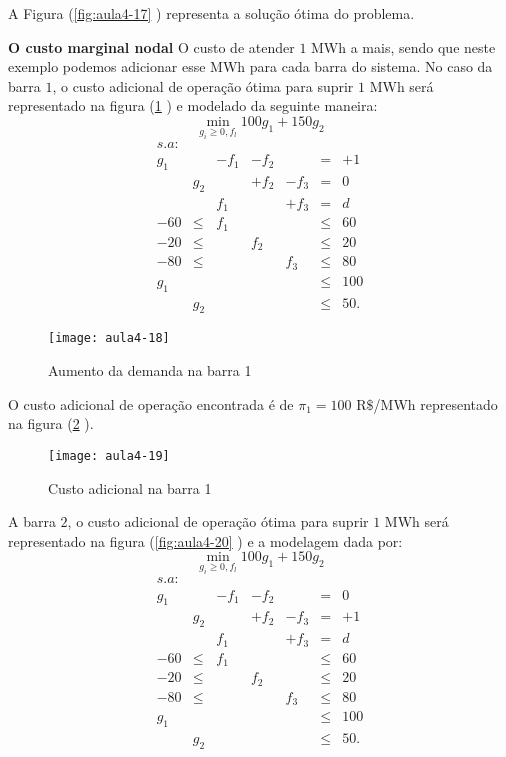 A Figura (\ref{fig:aula4-17} ) representa a solução ótima do problema.

\textbf{O custo marginal nodal}
O custo de atender $1$ MWh a mais, sendo que neste exemplo podemos adicionar esse MWh para cada barra do sistema.
No caso da barra $1$, o custo adicional de operação ótima para suprir $1$ MWh será representado na figura (\ref{fig:aula4-18} ) e  modelado da seguinte maneira:
\[
\min_{g_{i}\geq0,f_{l}}100g_{1}+150g_{2}
\]
\[
\begin{array}{ccccccc}
s.a:\\
g_{1} &  & -f_{1} & -f_{2} &  & = & +1\\
 & g_{2} &  & +f_{2} & -f_{3} & = & 0\\
 &  & f_{1} &  & +f_{3} & = & d\\
-60 & \leq & f_{1} &  &  & \leq & 60\\
-20 & \leq &  & f_{2} &  & \leq & 20\\
-80 & \leq &  &  & f_{3} & \leq & 80\\
g_{1} &  &  &  &  & \leq & 100\\
 & g_{2} &  &  &  & \leq & 50.
\end{array}
\]

\begin{figure}[H]
\begin{centering}
\texttt{[image: aula4-18]}\protect\caption{\label{fig:aula4-18} Aumento da demanda na barra 1 }
\end{centering}
\end{figure}
O custo adicional de operação encontrada é de $\pi_{1}=100$ R$\$$/MWh representado na figura (\ref{fig:aula4-19} ).
\begin{figure}[H]
\begin{centering}
\texttt{[image: aula4-19]}\protect\caption{\label{fig:aula4-19} Custo adicional na barra 1 }
\end{centering}
\end{figure}

A barra $2$, o custo adicional de operação ótima para suprir $1$ MWh será representado na figura (\ref{fig:aula4-20} ) e a modelagem dada por:
\[
\min_{g_{i}\geq0,f_{l}}100g_{1}+150g_{2}
\]
\[
\begin{array}{ccccccc}
s.a:\\
g_{1} &  & -f_{1} & -f_{2} &  & = & 0\\
 & g_{2} &  & +f_{2} & -f_{3} & = & +1\\
 &  & f_{1} &  & +f_{3} & = & d\\
-60 & \leq & f_{1} &  &  & \leq & 60\\
-20 & \leq &  & f_{2} &  & \leq & 20\\
-80 & \leq &  &  & f_{3} & \leq & 80\\
g_{1} &  &  &  &  & \leq & 100\\
 & g_{2} &  &  &  & \leq & 50.
\end{array}
\]

